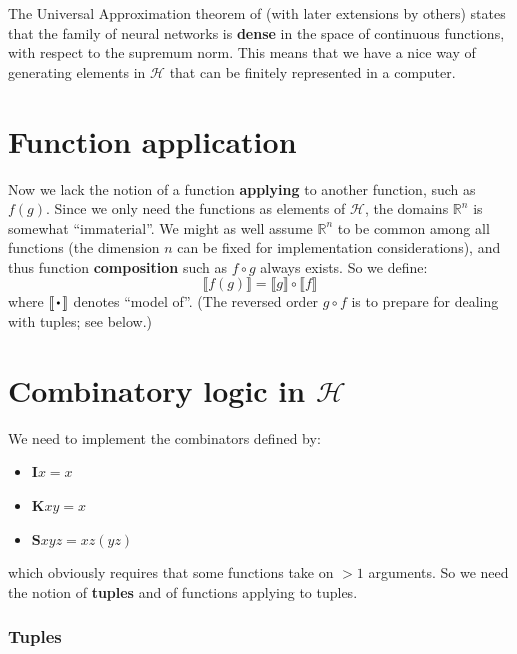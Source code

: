 The Universal Approximation theorem of \parencite{Cybenko1989} (with later extensions by others) states that the family of neural networks is \textbf{dense} in the space of continuous functions, with respect to the supremum norm.  This means that we have a nice way of generating elements in $\mathcal{H}$ that can be finitely represented in a computer.

\section{Function application}

Now we lack the notion of a function \textbf{applying} to another function, such as $f(g)$.  Since we only need the functions as elements of $\mathcal{H}$, the domains $\mathbb{R}^n$ is somewhat ``immaterial''.  We might as well assume $\mathbb{R}^n$ to be common among all functions (the dimension $n$ can be fixed for implementation considerations), and thus function \textbf{composition} such as $f \circ g$ always exists.  So we define:
\begin{equation}
\llbracket f(g) \rrbracket = \llbracket g \rrbracket \circ \llbracket f \rrbracket
\end{equation}
where $\llbracket \Cdot \rrbracket$ denotes ``model of''.  (The reversed order $g \circ f$ is to prepare for dealing with tuples; see below.)

\section{Combinatory logic in $\mathcal{H}$}

We need to implement the combinators defined by:
\begin{itemize}
	\item $\mathbf{I} x = x$
	\item $\mathbf{K} x y = x$
	\item $\mathbf{S} x y z = xz (yz)$
\end{itemize}
which obviously requires that some functions take on $> 1$ arguments.  So we need the notion of \textbf{tuples} and of functions applying to tuples.

\subsubsection*{Tuples}

